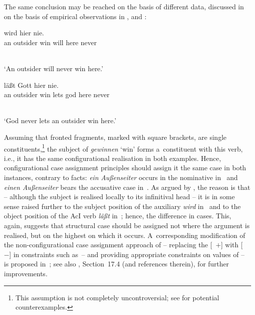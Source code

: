 \documentclass[output=paper]{langsci/langscibook}
\begin{document}
The same conclusion may be reached on the basis of different data, discussed in \citealt{Meurers99c,Meurers99b} on the basis of empirical observations in \citealt{Haider90a}, \citealt{Grewendorf94a} and \citealt{Mueller97c-Eng-Short-Cross}:
\begin{examples}
\item \label{win:ss}
  \begin{gloss}
     wird hier nie. \\
    \phtm{[}an\Nom{} outsider win\Inf{} will here never
  \end{gloss}\\[\glosslen]
  `An outsider will never win here.'
\item \label{win:so}
  \begin{gloss}
     l\"a\ss{}t Gott hier
    nie. \\
    \phtm{[}an\Acc{} outsider win\Inf{} lets god here never
  \end{gloss}\\[\glosslen]
  `God never lets an outsider win here.'
\end{examples}
Assuming that fronted fragments, marked with square brackets, are single constituents,\footnote{This assumption is not completely uncontroversial; see \citet[100–101]{Kiss94} for potential counterexamples.} the subject of \emph{gewinnen} ‘win’ forms a~constituent with this verb, i.e., it has the same configurational realisation in both examples.  Hence, configurational case assignment principles should assign it the same case in both instances, contrary to facts: \emph{ein Au\ss{}enseiter} occurs in the nominative in~ and \emph{einen Au\ss{}enseiter} bears the accusative case in~.  As argued by \citealt{Meurers99c,Meurers99b}, the reason is that – although the subject is realised locally to its infinitival head – it is in some sense raised further to the subject position of the auxiliary \emph{wird} in~ and to the object position of the AcI verb \emph{l\"a\ss{}t} in~; hence, the difference in cases.  This, again, suggests that structural case should be assigned not where the argument is realised, but on the highest  on which it occurs.  A~corresponding modification of the non-configurational case assignment approach of \citealt{prze:96,Prze99,Prze99b} – replacing the [~$+$] with [~$-$] in constraints such as~– and providing appropriate constraints on values of  – is proposed in~\citealt[93–95]{Prze99b}; see also \citealt{MuellerLehrbuch3}, Section~17.4 (and references therein), for further improvements.
\end{document}
